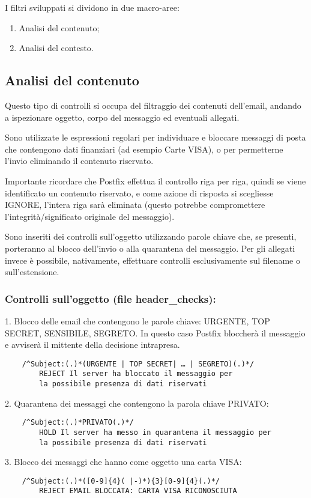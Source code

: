     I filtri sviluppati si dividono in due macro-aree:

    \begin{enumerate}
        \item Analisi del contenuto;
        \item Analisi del contesto.
    \end{enumerate}

    \subsection{Analisi del contenuto}
    Questo tipo di controlli si occupa del filtraggio dei contenuti dell'email, 
    andando a ispezionare oggetto, corpo del messaggio ed eventuali allegati. 
    
    Sono utilizzate le espressioni regolari per individuare e bloccare messaggi di posta che contengono dati
    finanziari (ad esempio Carte VISA), o per permetterne l’invio eliminando il contenuto riservato. 
    
    Importante ricordare che Postfix effettua il controllo riga per riga, quindi se viene identificato un 
    contenuto riservato, e come azione di risposta si scegliesse IGNORE, 
    l’intera riga sarà eliminata (questo potrebbe compromettere l’integrità/significato originale del messaggio). 
    
    Sono inseriti dei controlli sull’oggetto utilizzando parole chiave che, se presenti, 
    porteranno al blocco dell’invio o alla quarantena del messaggio. Per gli allegati invece è possibile, nativamente,
    effettuare controlli esclusivamente sul filename o sull’estensione. 

    \subsubsection{Controlli sull'oggetto (file header\_checks):}

    1. Blocco delle email che contengono le parole chiave: URGENTE, TOP SECRET, SENSIBILE, SEGRETO.
    In questo caso Postfix bloccherà il messaggio e avviserà il mittente della decisione intrapresa.

    \begin{verbatim}
    /^Subject:(.)*(URGENTE | TOP SECRET| … | SEGRETO)(.)*/
        REJECT Il server ha bloccato il messaggio per 
        la possibile presenza di dati riservati
    \end{verbatim}
    2. Quarantena dei messaggi che contengono la parola chiave PRIVATO:
    \begin{verbatim}
    /^Subject:(.)*PRIVATO(.)*/
        HOLD Il server ha messo in quarantena il messaggio per 
        la possibile presenza di dati riservati
    \end{verbatim}
    3. Blocco dei messaggi che hanno come oggetto una carta VISA:
    \begin{verbatim}
    /^Subject:(.)*([0-9]{4}( |-)*){3}[0-9]{4}(.)*/
        REJECT EMAIL BLOCCATA: CARTA VISA RICONOSCIUTA
    \end{verbatim}


